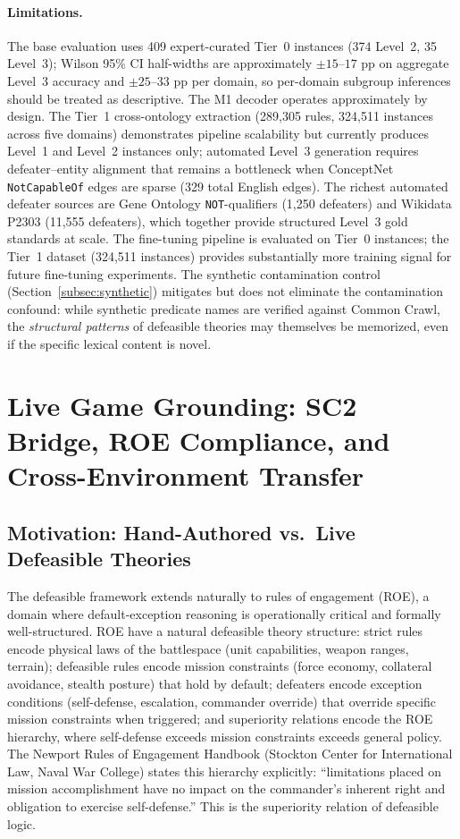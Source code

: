 \documentclass{article}
\theoremstyle{definition}
\begin{document}
\paragraph{Limitations.} The base evaluation uses 409 expert-curated Tier~0 instances (374 Level~2, 35 Level~3); Wilson 95\% CI half-widths are approximately $\pm 15$--$17$ pp on aggregate Level~3 accuracy and $\pm 25$--$33$ pp per domain, so per-domain subgroup inferences should be treated as descriptive. The M1 decoder operates approximately by design. The Tier~1 cross-ontology extraction (289,305 rules, 324,511 instances across five domains) demonstrates pipeline scalability but currently produces Level~1 and Level~2 instances only; automated Level~3 generation requires defeater--entity alignment that remains a bottleneck when ConceptNet \texttt{NotCapableOf} edges are sparse (329 total English edges). The richest automated defeater sources are Gene Ontology \texttt{NOT}-qualifiers (1,250 defeaters) and Wikidata P2303 (11,555 defeaters), which together provide structured Level~3 gold standards at scale. The fine-tuning pipeline is evaluated on Tier~0 instances; the Tier~1 dataset (324,511 instances) provides substantially more training signal for future fine-tuning experiments. The synthetic contamination control (Section~\ref{subsec:synthetic}) mitigates but does not eliminate the contamination confound: while synthetic predicate names are verified against Common Crawl, the \emph{structural patterns} of defeasible theories may themselves be memorized, even if the specific lexical content is novel.

\section{Live Game Grounding: SC2 Bridge, ROE Compliance, and Cross-Environment Transfer}\label{sec:sc2live}

\subsection{Motivation: Hand-Authored vs.\ Live Defeasible Theories}\label{subsec:sc2live-motivation}

The defeasible framework extends naturally to rules of engagement (ROE), a domain where default-exception reasoning is operationally critical and formally well-structured. ROE have a natural defeasible theory structure: strict rules encode physical laws of the battlespace (unit capabilities, weapon ranges, terrain); defeasible rules encode mission constraints (force economy, collateral avoidance, stealth posture) that hold by default; defeaters encode exception conditions (self-defense, escalation, commander override) that override specific mission constraints when triggered; and superiority relations encode the ROE hierarchy, where self-defense exceeds mission constraints exceeds general policy. The Newport Rules of Engagement Handbook (Stockton Center for International Law, Naval War College) states this hierarchy explicitly: ``limitations placed on mission accomplishment have no impact on the commander's inherent right and obligation to exercise self-defense.'' This is the superiority relation of defeasible logic.
\end{document}
